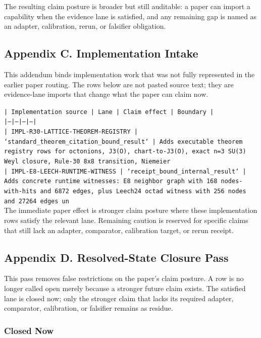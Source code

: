\documentclass[11pt]{article}
\begin{document}
The resulting claim posture is broader but still auditable: a paper can import a capability when the evidence lane is satisfied, and any remaining gap is named as an adapter, calibration, rerun, or falsifier obligation.

\subsection*{Appendix C. Implementation Intake}

This addendum binds implementation work that was not fully represented in the earlier paper routing. The rows below are not pasted source text; they are evidence-lane imports that change what the paper can claim now.

\noindent\texttt{| Implementation source | Lane | Claim effect | Boundary |}\\
\noindent\texttt{|---|---|---|---|}\\
\noindent\texttt{| IMPL-R30-LATTICE-THEOREM-REGISTRY | `standard\_theorem\_citation\_bound\_result` | Adds executable theorem registry rows for octonions, J3(O), chart-to-J3(O), exact n=3 SU(3) Weyl closure, Rule-30 8x8 transition, Niemeier }\\
\noindent\texttt{| IMPL-E8-LEECH-RUNTIME-WITNESS | `receipt\_bound\_internal\_result` | Adds concrete runtime witnesses: E8 neighbor graph with 168 nodes-with-hits and 6872 edges, plus Leech24 octad witness with 256 nodes and 27264 edges un}\\

The immediate paper effect is stronger claim posture where these implementation rows satisfy the relevant lane. Remaining caution is reserved for specific claims that still lack an adapter, comparator, calibration target, or rerun receipt.

\subsection*{Appendix D. Resolved-State Closure Pass}

This pass removes false restrictions on the paper's claim posture. A row is no longer called open merely because a stronger future claim exists. The satisfied lane is closed now; only the stronger claim that lacks its required adapter, comparator, calibration, or falsifier remains as residue.

\subsubsection*{Closed Now}
\end{document}
